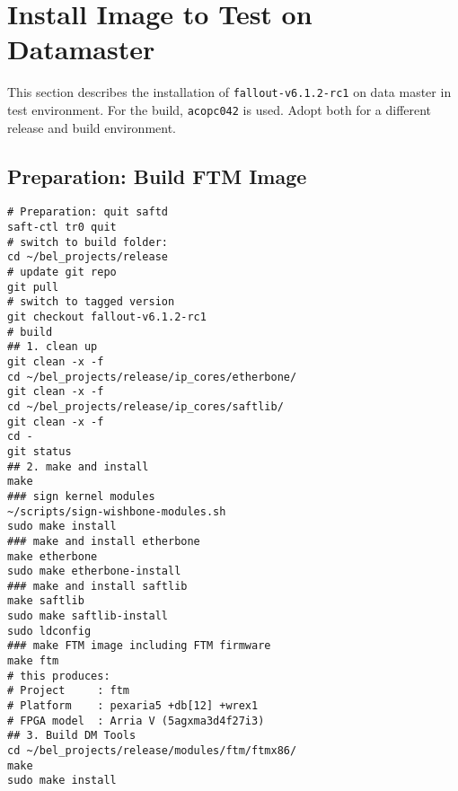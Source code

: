 \documentclass[12pt,a4paper]{report}
\begin{document}
\section{Install Image to Test on Datamaster}
This section describes the installation of \texttt{fallout-v6.1.2-rc1} on data master in test environment.
For the build, \texttt{acopc042} is used. Adopt both for a different release and build environment.

\subsection{Preparation: Build FTM Image}
\begin{verbatim}
# Preparation: quit saftd
saft-ctl tr0 quit
# switch to build folder:
cd ~/bel_projects/release
# update git repo
git pull
# switch to tagged version
git checkout fallout-v6.1.2-rc1
# build
## 1. clean up
git clean -x -f
cd ~/bel_projects/release/ip_cores/etherbone/
git clean -x -f
cd ~/bel_projects/release/ip_cores/saftlib/
git clean -x -f
cd -
git status
## 2. make and install
make
### sign kernel modules
~/scripts/sign-wishbone-modules.sh
sudo make install
### make and install etherbone
make etherbone
sudo make etherbone-install
### make and install saftlib
make saftlib
sudo make saftlib-install
sudo ldconfig
### make FTM image including FTM firmware
make ftm
# this produces:
# Project     : ftm
# Platform    : pexaria5 +db[12] +wrex1
# FPGA model  : Arria V (5agxma3d4f27i3)
## 3. Build DM Tools
cd ~/bel_projects/release/modules/ftm/ftmx86/
make
sudo make install
\end{verbatim}
\end{document}
